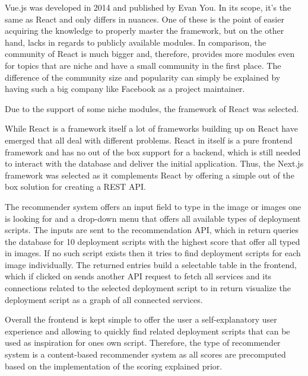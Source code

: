 Vue.js was developed in 2014 and published by Evan You. In its scope, it's the same as React and only differs in nuances. One of these is the point of easier acquiring the knowledge to properly master the framework, but on the other hand, lacks in regards to publicly available modules. In comparison, the community of React is much bigger and, therefore, provides more modules even for topics that are niche and have a small community in the first place. The difference of the community size and popularity can simply be explained by having such a big company like Facebook as a project maintainer.

Due to the support of some niche modules, the framework of React was selected.

While React is a framework itself a lot of frameworks building up on React have emerged that all deal with different problems. React in itself is a pure frontend framework and has no out of the box support for a backend, which is still needed to interact with the database and deliver the initial application. Thus, the Next.js framework was selected as it complements React by offering a simple out of the box solution for creating a REST API.

The recommender system offers an input field to type in the image or images one is looking for and a drop-down menu that offers all available types of deployment scripts. The inputs are sent to the recommendation API, which in return queries the database for 10 deployment scripts with the highest score that offer all typed in images. If no such script exists then it tries to find deployment scripts for each image individually. The returned entries build a selectable table in the frontend, which if clicked on sends another API request to fetch all services and its connections related to the selected deployment script to in return visualize the deployment script as a graph of all connected services.

Overall the frontend is kept simple to offer the user a self-explanatory user experience and allowing to quickly find related deployment scripts that can be used as inspiration for ones own script. Therefore, the type of recommender system is a content-based recommender system as all scores are precomputed based on the implementation of the scoring explained prior.
